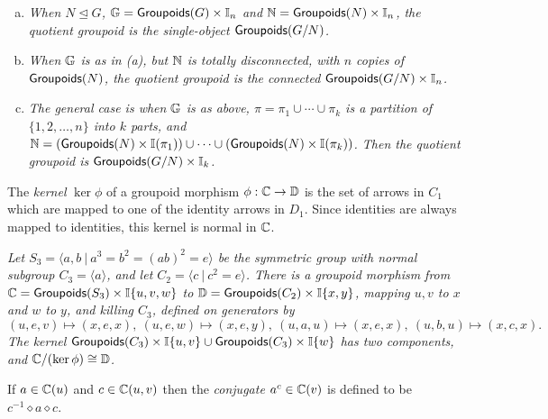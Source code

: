 \begin{figure}[htbp]
\begin{center}

\label{figure:gpd-equiv}
\end{center}
\end{figure}

\medskip
\begin{example}
\begin{enumerate}[(a)]
\item
\emph{When $N \unlhd G$, $\mathbb{G} = {\sf Groupoids}(G)\times\mathbb{I}_n$ and 
$\mathbb{N} = {\sf Groupoids}(N)\times\mathbb{I}_n$, the quotient groupoid is 
the single-object ${\sf Groupoids}(G/N)$.} 
\item
\emph{When $\mathbb{G}$ is as in (a), but $\mathbb{N}$ is totally disconnected, 
with $n$ copies of ${\sf Groupoids}(N)$, the quotient groupoid is the 
connected ${\sf Groupoids}(G/N)\times\mathbb{I}_n$.} 
\item
\emph{The general case is when $\mathbb{G}$ is as above, 
$\pi = \pi_1 \cup \cdots \cup \pi_k$ is a partition of $\{1,2,\ldots,n\}$ 
into $k$ parts, and 
$\mathbb{N} = ({\sf Groupoids}(N)\times\mathbb{I}(\pi_1))\cup\cdots\cup({\sf Groupoids}(N)\times\mathbb{I}(\pi_k))$.  
Then the quotient groupoid is ${\sf Groupoids}(G/N)\times\mathbb{I}_k$.} 
\end{enumerate}
\end{example}


\medskip {} 
The \emph{kernel} $\ker\phi$ of a groupoid morphism $\phi : \mathbb{C} \to \mathbb{D}$ 
is the set of arrows in $C_1$ which are mapped to 
one of the identity arrows in $D_1$. 
Since identities are always mapped to identities, 
this kernel is normal in $\mathbb{C}$. 

\begin{example}
\emph{Let $S_3 = \langle a,b ~|~ a^3=b^2=(ab)^2=e \rangle$ 
be the symmetric group with normal subgroup $C_3 = \langle a \rangle$, 
and let $C_2 = \langle c ~|~ c^2=e \rangle$. 
There is a groupoid morphism from $\mathbb{C} = {\sf Groupoids}(S_3)\times\mathbb{I}\{u,v,w\}$ 
to $\mathbb{D} = {\sf Groupoids}(C_2)\times\mathbb{I}\{x,y\}$, 
mapping $u,v$ to $x$ and $w$ to $y$, and killing $C_3$, 
defined on generators by 
$$
(u,e,v)\mapsto(x,e,x), ~
(u,e,w)\mapsto(x,e,y), ~
(u,a,u)\mapsto(x,e,x), ~ 
(u,b,u)\mapsto(x,c,x).
$$
The kernel ${\sf Groupoids}(C_3)\times\mathbb{I}\{u,v\} \cup {\sf Groupoids}(C_3)\times\mathbb{I}\{w\}$ 
has two components, and $\mathbb{C}/(\ker\phi)\cong\mathbb{D}$. 
}\end{example}

\medskip
If $a \in \mathbb{C}(u)$ and $c \in \mathbb{C}(u,v)$ then the \emph{conjugate} 
$a^c \in \mathbb{C}(v)$ is defined to be $c^{-1} \diamond a \diamond c$. 

